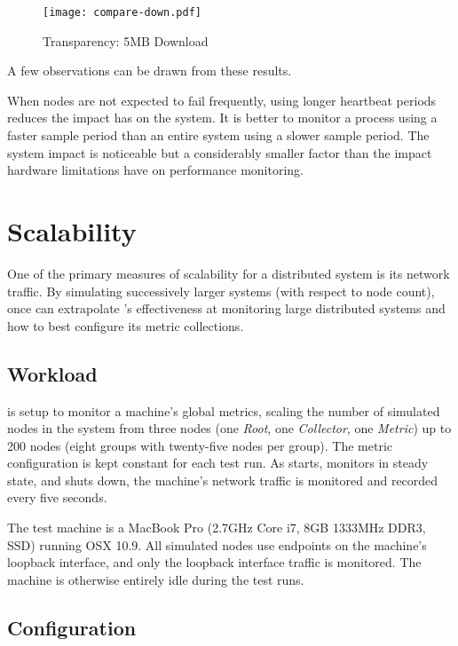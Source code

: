 \begin{figure}[H]
    \centering
    \vspace{-20pt}
    \texttt{[image: compare-down.pdf]}
    \vspace{-50pt}
    \caption{Transparency: 5MB Download}
    \label{fig:down5mb_graph}
\end{figure}

A few observations can be drawn from these results.

When nodes are not expected to fail frequently, using longer heartbeat periods reduces the impact \dcamp has on the
system. It is better to monitor a process using a faster sample period than an entire system using a slower sample
period. The \dcamp system impact is noticeable but a considerably smaller factor than the impact hardware limitations
have on performance monitoring.

\section{Scalability}

One of the primary measures of scalability for a distributed system is its network traffic.\cite{zanikolas2005} By
simulating successively larger \dcamp systems (with respect to node count), once can extrapolate \dcamp's effectiveness
at monitoring large distributed systems and how to best configure its metric collections.

\subsection{Workload}

\dcamp is setup to monitor a machine's global metrics, scaling the number of simulated nodes in the \dcamp system from
three nodes (one \textit{Root}, one \textit{Collector}, one \textit{Metric}) up to 200 nodes (eight groups with
twenty-five nodes per group). The metric configuration is kept constant for each test run. As \dcamp starts, monitors in
steady state, and shuts down, the machine's network traffic is monitored and recorded every five seconds.

The test machine is a MacBook Pro (2.7GHz Core i7, 8GB 1333MHz DDR3, SSD) running OSX 10.9. All simulated \dcamp nodes
use endpoints on the machine's loopback interface, and only the loopback interface traffic is monitored. The machine is
otherwise entirely idle during the test runs.

\subsection{\dcamp Configuration}

